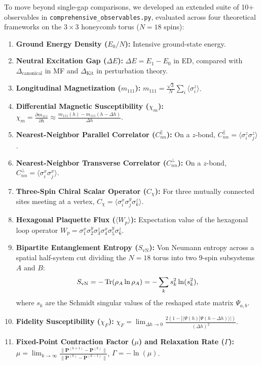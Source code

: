 To move beyond single-gap comparisons, we developed an extended suite of 10+ observables in \texttt{comprehensive\_observables.py}, evaluated across four theoretical frameworks on the $3 \times 3$ honeycomb torus ($N=18$ spins):
\begin{enumerate}
    \item \textbf{Ground Energy Density ($E_0 / N$):} Intensive ground-state energy.
    \item \textbf{Neutral Excitation Gap ($\Delta E$):} $\Delta E = E_1 - E_0$ in ED, compared with $\Delta_{\mathrm{canonical}}$ in MF and $\Delta_{\mathrm{Kit}}$ in perturbation theory.
    \item \textbf{Longitudinal Magnetization ($m_{111}$):} $m_{111} = \frac{\sqrt{3}}{N} \sum_i \langle \sigma_i^z \rangle$.
    \item \textbf{Differential Magnetic Susceptibility ($\chi_m$):} $\chi_m = \frac{\partial m_{111}}{\partial h} \approx \frac{m_{111}(h) - m_{111}(h - \Delta h)}{\Delta h}$.
    \item \textbf{Nearest-Neighbor Parallel Correlator ($C_{nn}^\parallel$):} On a $z$-bond, $C_{nn}^\parallel = \langle \sigma_i^z \sigma_j^z \rangle$.
    \item \textbf{Nearest-Neighbor Transverse Correlator ($C_{nn}^\perp$):} On a $z$-bond, $C_{nn}^\perp = \langle \sigma_i^x \sigma_j^x \rangle$.
    \item \textbf{Three-Spin Chiral Scalar Operator ($C_\chi$):} For three mutually connected sites meeting at a vertex, $C_\chi = \langle \sigma_i^x \sigma_j^y \sigma_k^z \rangle$.
    \item \textbf{Hexagonal Plaquette Flux ($\langle W_p \rangle$):} Expectation value of the hexagonal loop operator $W_p = \sigma_1^x \sigma_2^y \sigma_3^z \sigma_4^x \sigma_5^y \sigma_6^z$.
    \item \textbf{Bipartite Entanglement Entropy ($S_{\mathrm{vN}}$):} Von Neumann entropy across a spatial half-system cut dividing the $N=18$ torus into two 9-spin subsystems $A$ and $B$:
    \begin{equation}
    S_{\mathrm{vN}} = -\operatorname{Tr}(\rho_A \ln \rho_A) = -\sum_k s_k^2 \ln(s_k^2),
    \end{equation}
    where $s_k$ are the Schmidt singular values of the reshaped state matrix $\Psi_{a, b}$.
    \item \textbf{Fidelity Susceptibility ($\chi_F$):} $\chi_F = \lim_{\Delta h \to 0} \frac{2(1 - |\langle \Psi(h) | \Psi(h - \Delta h) \rangle|)}{(\Delta h)^2}$.
    \item \textbf{Fixed-Point Contraction Factor ($\mu$) and Relaxation Rate ($\Gamma$):} $\mu = \lim_{k \to \infty} \frac{\|\mathbf{P}^{(k+1)} - \mathbf{P}^{(k)}\|}{\|\mathbf{P}^{(k)} - \mathbf{P}^{(k-1)}\|}$, $\Gamma = -\ln(\mu)$.
\end{enumerate}

